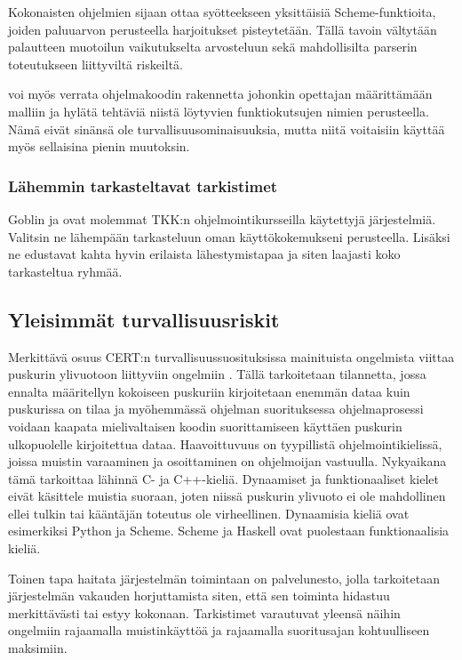 Kokonaisten ohjelmien sijaan {\scmrobo} ottaa syötteekseen yksittäisiä
Scheme-funktioita, joiden paluuarvon perusteella harjoitukset pisteytetään.
Tällä tavoin vältytään palautteen muotoilun vaikutukselta arvosteluun sekä
mahdollisilta parserin toteutukseen liittyviltä riskeiltä.
\citep{saikkonen2001fully}

{\scmrobo} voi myös verrata ohjelmakoodin rakennetta johonkin opettajan
määrittämään malliin ja hylätä tehtäviä niistä löytyvien funktiokutsujen
nimien perusteella. \citep{saikkonen2001fully} Nämä eivät sinänsä ole
turvallisuusominaisuuksia, mutta niitä voitaisiin käyttää myös sellaisina
pienin muutoksin.

\subsubsection{Lähemmin tarkasteltavat tarkistimet}

Goblin ja {\scmrobo} ovat molemmat TKK:n ohjelmointikursseilla käytettyjä
järjestelmiä. Valitsin ne lähempään tarkasteluun oman käyttökokemukseni
perusteella. Lisäksi ne edustavat kahta hyvin erilaista lähestymistapaa ja
siten laajasti koko tarkasteltua ryhmää.

\subsection{Yleisimmät turvallisuusriskit}

Merkittävä osuus CERT:n turvallisuussuosituksissa mainituista ongelmista
viittaa puskurin ylivuotoon liittyviin ongelmiin \citep{cert}. Tällä
tarkoitetaan tilannetta, jossa ennalta määritellyn
kokoiseen puskuriin kirjoitetaan enemmän dataa kuin puskurissa on tilaa ja
myöhemmässä ohjelman suorituksessa ohjelmaprosessi voidaan kaapata
mielivaltaisen koodin suorittamiseen käyttäen puskurin ulkopuolelle kirjoitettua
dataa. Haavoittuvuus on tyypillistä ohjelmointikielissä, joissa muistin
varaaminen ja osoittaminen on ohjelmoijan vastuulla. Nykyaikana tämä tarkoittaa
lähinnä C- ja C++-kieliä. Dynaamiset ja funktionaaliset kielet eivät käsittele
muistia suoraan, joten niissä puskurin ylivuoto ei ole mahdollinen ellei tulkin
tai kääntäjän toteutus ole virheellinen. Dynaamisia kieliä ovat esimerkiksi
Python ja Scheme. Scheme ja Haskell ovat puolestaan funktionaalisia kieliä.

Toinen tapa haitata järjestelmän toimintaan on palvelunesto, jolla tarkoitetaan
järjestelmän vakauden horjuttamista siten, että sen toiminta hidastuu
merkittävästi tai estyy kokonaan. Tarkistimet varautuvat yleensä näihin
ongelmiin rajaamalla muistinkäyttöä ja rajaamalla suoritusajan kohtuulliseen
maksimiin.

